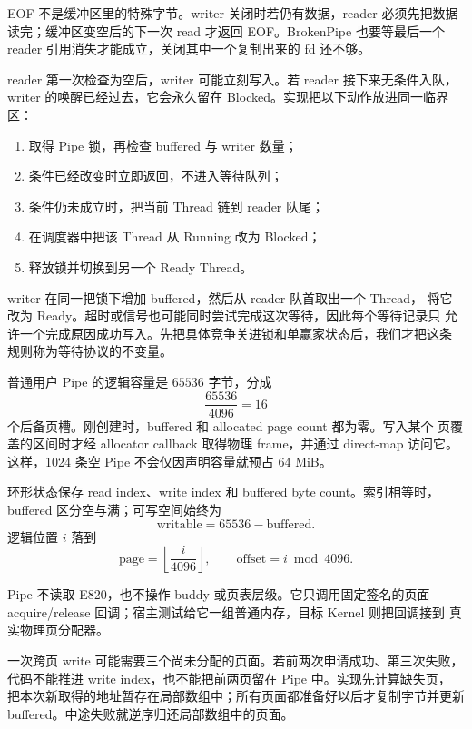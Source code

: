 EOF 不是缓冲区里的特殊字节。writer 关闭时若仍有数据，reader 必须先把数据
读完；缓冲区变空后的下一次 read 才返回 EOF。BrokenPipe 也要等最后一个
reader 引用消失才能成立，关闭其中一个复制出来的 fd 还不够。

reader 第一次检查为空后，writer 可能立刻写入。若 reader 接下来无条件入队，
writer 的唤醒已经过去，它会永久留在 Blocked。实现把以下动作放进同一临界区：

\begin{enumerate}[label=\arabic*.]
  \item 取得 Pipe 锁，再检查 buffered 与 writer 数量；
  \item 条件已经改变时立即返回，不进入等待队列；
  \item 条件仍未成立时，把当前 Thread 链到 reader 队尾；
  \item 在调度器中把该 Thread 从 Running 改为 Blocked；
  \item 释放锁并切换到另一个 Ready Thread。
\end{enumerate}

writer 在同一把锁下增加 buffered，然后从 reader 队首取出一个 Thread，
将它改为 Ready。超时或信号也可能同时尝试完成这次等待，因此每个等待记录只
允许一个完成原因成功写入。先把具体竞争关进锁和单赢家状态后，我们才把这条
规则称为等待协议的不变量。

普通用户 Pipe 的逻辑容量是 \(65536\) 字节，分成
\[
  \frac{65536}{4096}=16
\]
个后备页槽。刚创建时，buffered 和 allocated page count 都为零。写入某个
页覆盖的区间时才经 allocator callback 取得物理 frame，并通过 direct-map
访问它。这样，1024 条空 Pipe 不会仅因声明容量就预占 64 MiB。

环形状态保存 read index、write index 和 buffered byte count。索引相等时，
buffered 区分空与满；可写空间始终为
\[
  \mathrm{writable}=65536-\mathrm{buffered}.
\]
逻辑位置 \(i\) 落到
\[
  \mathrm{page}=\left\lfloor\frac{i}{4096}\right\rfloor,\qquad
  \mathrm{offset}=i\bmod4096.
\]

Pipe 不读取 E820，也不操作 buddy 或页表层级。它只调用固定签名的页面
acquire/release 回调；宿主测试给它一组普通内存，目标 Kernel 则把回调接到
真实物理页分配器。

一次跨页 write 可能需要三个尚未分配的页面。若前两次申请成功、第三次失败，
代码不能推进 write index，也不能把前两页留在 Pipe 中。实现先计算缺失页，
把本次新取得的地址暂存在局部数组中；所有页面都准备好以后才复制字节并更新
buffered。中途失败就逆序归还局部数组中的页面。

